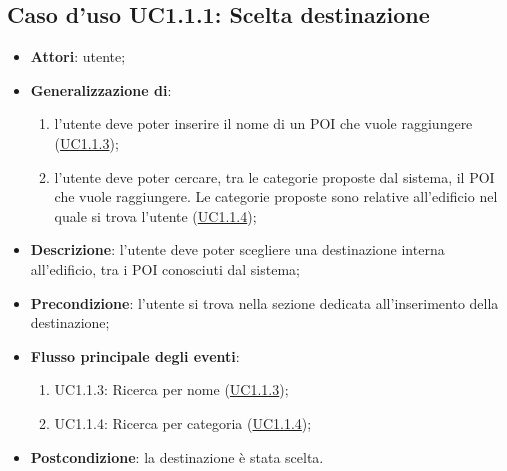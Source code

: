 \documentclass[../AnalisiDeiRequisiti.tex]{subfiles}
\begin{document}
\subsection{Caso d'uso UC1.1.1: Scelta destinazione}

\begin{itemize}
\item \textbf{Attori}: utente;

        \item \textbf{Generalizzazione di}:
          \begin{enumerate}
          \item l'utente deve poter inserire il nome di un POI che vuole raggiungere (\hyperlink{UC1.1.3}{UC1.1.3});
          \item l'utente deve poter cercare, tra le categorie proposte dal sistema, il POI che vuole raggiungere. Le categorie proposte sono relative all'edificio nel quale si trova l'utente (\hyperlink{UC1.1.4}{UC1.1.4});

      \end{enumerate}
\item \textbf{Descrizione}: l'utente deve poter scegliere una destinazione interna all'edificio, tra i POI conosciuti dal sistema; 
      \item \textbf{Precondizione}: l'utente si trova nella sezione dedicata all'inserimento della destinazione;

        \item \textbf{Flusso principale degli eventi}:
          \begin{enumerate}
          \item UC1.1.3: Ricerca per nome (\hyperlink{UC1.1.3}{UC1.1.3});
          \item UC1.1.4: Ricerca per categoria (\hyperlink{UC1.1.4}{UC1.1.4});

      \end{enumerate}
    \item \textbf{Postcondizione}: la destinazione è stata scelta.
  \end{itemize}
\hypertarget{UC1.1.2}{}
\end{document}
